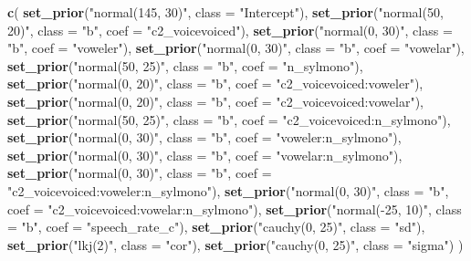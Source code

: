 \documentclass[11pt,]{article}
\newenvironment{Shaded}{\begin{snugshade}}{\end{snugshade}}
\newcommand{\KeywordTok}[1]{\textcolor[rgb]{0.13,0.29,0.53}{\textbf{#1}}}
\newcommand{\DataTypeTok}[1]{\textcolor[rgb]{0.13,0.29,0.53}{#1}}
\newcommand{\StringTok}[1]{\textcolor[rgb]{0.31,0.60,0.02}{#1}}
\newcommand{\NormalTok}[1]{#1}
\begin{document}
\begin{Shaded}
\begin{Highlighting}[]
\KeywordTok{c}\NormalTok{(}
  \KeywordTok{set_prior}\NormalTok{(}\StringTok{"normal(145, 30)"}\NormalTok{, }\DataTypeTok{class =} \StringTok{"Intercept"}\NormalTok{),}
  \KeywordTok{set_prior}\NormalTok{(}\StringTok{"normal(50, 20)"}\NormalTok{, }\DataTypeTok{class =} \StringTok{"b"}\NormalTok{, }\DataTypeTok{coef =} \StringTok{"c2_voicevoiced"}\NormalTok{),}
  \KeywordTok{set_prior}\NormalTok{(}\StringTok{"normal(0, 30)"}\NormalTok{, }\DataTypeTok{class =} \StringTok{"b"}\NormalTok{, }\DataTypeTok{coef =} \StringTok{"voweler"}\NormalTok{),}
  \KeywordTok{set_prior}\NormalTok{(}\StringTok{"normal(0, 30)"}\NormalTok{, }\DataTypeTok{class =} \StringTok{"b"}\NormalTok{, }\DataTypeTok{coef =} \StringTok{"vowelar"}\NormalTok{),}
  \KeywordTok{set_prior}\NormalTok{(}\StringTok{"normal(50, 25)"}\NormalTok{, }\DataTypeTok{class =} \StringTok{"b"}\NormalTok{, }\DataTypeTok{coef =} \StringTok{"n_sylmono"}\NormalTok{),}
  \KeywordTok{set_prior}\NormalTok{(}\StringTok{"normal(0, 20)"}\NormalTok{, }\DataTypeTok{class =} \StringTok{"b"}\NormalTok{, }\DataTypeTok{coef =} \StringTok{"c2_voicevoiced:voweler"}\NormalTok{),}
  \KeywordTok{set_prior}\NormalTok{(}\StringTok{"normal(0, 20)"}\NormalTok{, }\DataTypeTok{class =} \StringTok{"b"}\NormalTok{, }\DataTypeTok{coef =} \StringTok{"c2_voicevoiced:vowelar"}\NormalTok{),}
  \KeywordTok{set_prior}\NormalTok{(}\StringTok{"normal(50, 25)"}\NormalTok{, }\DataTypeTok{class =} \StringTok{"b"}\NormalTok{, }\DataTypeTok{coef =} \StringTok{"c2_voicevoiced:n_sylmono"}\NormalTok{),}
  \KeywordTok{set_prior}\NormalTok{(}\StringTok{"normal(0, 30)"}\NormalTok{, }\DataTypeTok{class =} \StringTok{"b"}\NormalTok{, }\DataTypeTok{coef =} \StringTok{"voweler:n_sylmono"}\NormalTok{),}
  \KeywordTok{set_prior}\NormalTok{(}\StringTok{"normal(0, 30)"}\NormalTok{, }\DataTypeTok{class =} \StringTok{"b"}\NormalTok{, }\DataTypeTok{coef =} \StringTok{"vowelar:n_sylmono"}\NormalTok{),}
  \KeywordTok{set_prior}\NormalTok{(}\StringTok{"normal(0, 30)"}\NormalTok{, }\DataTypeTok{class =} \StringTok{"b"}\NormalTok{, }\DataTypeTok{coef =} \StringTok{"c2_voicevoiced:voweler:n_sylmono"}\NormalTok{),}
  \KeywordTok{set_prior}\NormalTok{(}\StringTok{"normal(0, 30)"}\NormalTok{, }\DataTypeTok{class =} \StringTok{"b"}\NormalTok{, }\DataTypeTok{coef =} \StringTok{"c2_voicevoiced:vowelar:n_sylmono"}\NormalTok{),}
  \KeywordTok{set_prior}\NormalTok{(}\StringTok{"normal(-25, 10)"}\NormalTok{, }\DataTypeTok{class =} \StringTok{"b"}\NormalTok{, }\DataTypeTok{coef =} \StringTok{"speech_rate_c"}\NormalTok{),}
  \KeywordTok{set_prior}\NormalTok{(}\StringTok{"cauchy(0, 25)"}\NormalTok{, }\DataTypeTok{class =} \StringTok{"sd"}\NormalTok{),}
  \KeywordTok{set_prior}\NormalTok{(}\StringTok{"lkj(2)"}\NormalTok{, }\DataTypeTok{class =} \StringTok{"cor"}\NormalTok{),}
  \KeywordTok{set_prior}\NormalTok{(}\StringTok{"cauchy(0, 25)"}\NormalTok{, }\DataTypeTok{class =} \StringTok{"sigma"}\NormalTok{)}
\NormalTok{)}
\end{Highlighting}
\end{Shaded}
\end{document}

